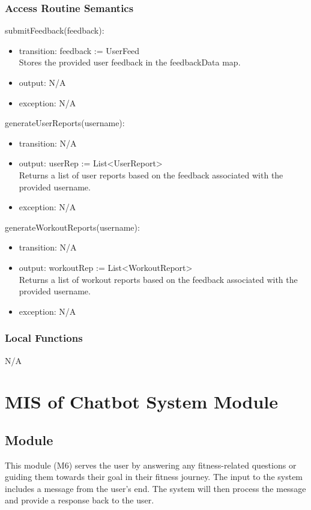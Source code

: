 \documentclass[12pt, titlepage]{article}
\begin{document}
\subsubsection{Access Routine Semantics}

\noindent submitFeedback(feedback):
\begin{itemize}
\item transition: feedback := UserFeed \\
Stores the provided user feedback in the feedbackData map.
\item output: N/A
\item exception: N/A
\end{itemize}

\noindent generateUserReports(username):
\begin{itemize}
\item transition: N/A
\item output:  userRep := List\textless UserReport\textgreater \\
Returns a list of user reports based on the feedback associated with the provided username.
\item exception: N/A
\end{itemize}

\noindent generateWorkoutReports(username):
\begin{itemize}
\item transition: N/A
\item output: workoutRep := List\textless WorkoutReport\textgreater \\
Returns a list of workout reports based on the feedback associated with the provided username.
\item exception: N/A
\end{itemize}


\subsubsection{Local Functions}
N/A

\section{MIS of Chatbot System Module}

\subsection{Module}
This module (M6) serves the user by answering any fitness-related questions or guiding them towards their goal in their fitness journey. The input to the system includes a message from the user's end. The system will then process the message and provide a response back to the user. 
 
\end{document}

